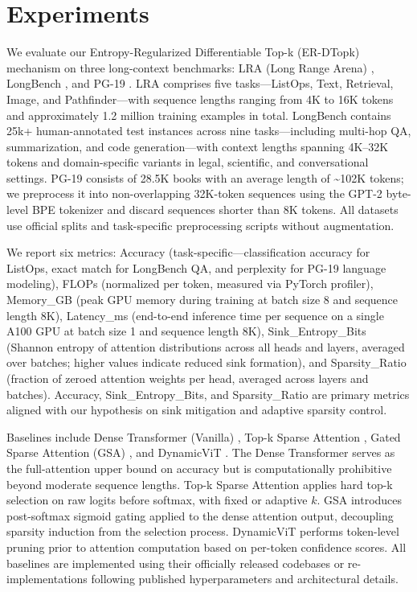 \documentclass{article}
\begin{document}
\section{Experiments}
We evaluate our Entropy-Regularized Differentiable Top-k (ER-DTopk) mechanism on three long-context benchmarks: LRA (Long Range Arena) \cite{tay2020}, LongBench \cite{zheng2023}, and PG-19 \cite{rae2020}. LRA comprises five tasks---ListOps, Text, Retrieval, Image, and Pathfinder---with sequence lengths ranging from 4K to 16K tokens and approximately 1.2 million training examples in total. LongBench contains 25k+ human-annotated test instances across nine tasks---including multi-hop QA, summarization, and code generation---with context lengths spanning 4K--32K tokens and domain-specific variants in legal, scientific, and conversational settings. PG-19 consists of 28.5K books with an average length of \~{}102K tokens; we preprocess it into non-overlapping 32K-token sequences using the GPT-2 byte-level BPE tokenizer and discard sequences shorter than 8K tokens. All datasets use official splits and task-specific preprocessing scripts without augmentation.

We report six metrics: Accuracy (task-specific---classification accuracy for ListOps, exact match for LongBench QA, and perplexity for PG-19 language modeling), FLOPs (normalized per token, measured via PyTorch profiler), Memory\_GB (peak GPU memory during training at batch size 8 and sequence length 8K), Latency\_ms (end-to-end inference time per sequence on a single A100 GPU at batch size 1 and sequence length 8K), Sink\_Entropy\_Bits (Shannon entropy of attention distributions across all heads and layers, averaged over batches; higher values indicate reduced sink formation), and Sparsity\_Ratio (fraction of zeroed attention weights per head, averaged across layers and batches). Accuracy, Sink\_Entropy\_Bits, and Sparsity\_Ratio are primary metrics aligned with our hypothesis on sink mitigation and adaptive sparsity control.

Baselines include Dense Transformer (Vanilla) \cite{vaswani2017}, Top-k Sparse Attention \cite{zhou2022}, Gated Sparse Attention (GSA) \cite{shen2026}, and DynamicViT \cite{rao2021}. The Dense Transformer serves as the full-attention upper bound on accuracy but is computationally prohibitive beyond moderate sequence lengths. Top-k Sparse Attention applies hard top-k selection on raw logits before softmax, with fixed or adaptive $k$. GSA introduces post-softmax sigmoid gating applied to the dense attention output, decoupling sparsity induction from the selection process. DynamicViT performs token-level pruning prior to attention computation based on per-token confidence scores. All baselines are implemented using their officially released codebases or re-implementations following published hyperparameters and architectural details.
\end{document}
